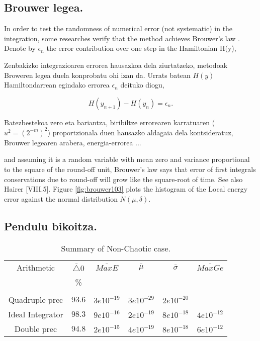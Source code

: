 \subsection{Brouwer legea.}

In order to test the randomness of numerical error (not systematic) in the integration, some researches verify that the method achieves Brouwer's law \cite{Brouwer1937}. Denote by $\epsilon_{n}$ the error contribution over one step in the Hamiltonian H(y),

Zenbakizko integrazioaren errorea hausazkoa dela ziurtatzeko, metodoak Broweren legea \cite{Brouwer1937} duela konprobatu ohi izan da. Urrats batean $H(y)$ Hamiltondarrean egindako errorea $\epsilon_{n}$ deituko diogu,

\begin{equation} \label{eq:18}
H(y_{n+1})-H(y_{n})=\epsilon_{n}.
\end{equation}

Batezbestekoa zero eta bariantza, biribiltze errorearen karratuaren ($u^2=(2^{-m})^2$) proportzionala duen hausazko aldagaia dela kontsideratuz, 
Brouwer legearen arabera, energia-errorea ...

and assuming it is a random variable with mean zero and variance proportional to the square of the round-off unit, Brouwer's law says that error of first integrals conservations due to round-off will grow like the square-root of time. See also Hairer \cite{Hairer2006}[VIII.5]. Figure \ref{fig:brouwer103} plots the histogram of the Local energy error against the normal distribution $N(\mu, \delta)$.

\subsection{Pendulu bikoitza.}

\begin{table} [h]
\caption{Summary of Non-Chaotic case.}
\label{tab:2}       %
\begin{tabular}{c|c c c c c} 
 Arithmetic   &  $\bar{\triangle}0$  &  $\bar{MaxE}$ & $\bar{\mu}$  & $\bar{\sigma}$   & $\bar{MaxGe}$  \\
                           &   \%            &       &          &            &         \\
 \hline
                           &                 &         &       &           &          \\
 Quadruple prec            &   $93.6$        &  $3e10^{-19}$  & $3e10^{-29}$  & $2e10^{-20}$  &      \\	    
 Ideal Integrator          &   $98.3$        &  $9e10^{-16}$  & $2e10^{-19}$  & $8e10^{-18}$ &  $4e10^{-12}$\\
 Double prec               &   $94.8$        &  $2e10^{-15}$  & $4e10^{-19}$  & $8e10^{-18}$ &  $6e10^{-12}$\\
\end{tabular}
\end{table}

